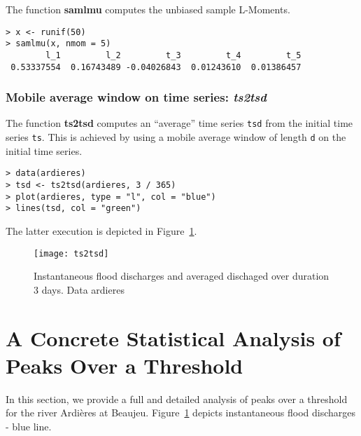 \documentclass[11pt,a4paper]{article}
\numberwithin{equation}{section}
\theoremstyle{definition}
\begin{document}
The function \textbf{samlmu} computes the unbiased sample L-Moments.
\begin{verbatim}
> x <- runif(50)
> samlmu(x, nmom = 5)
        l_1         l_2         t_3         t_4         t_5 
 0.53337554  0.16743489 -0.04026843  0.01243610  0.01386457
\end{verbatim}

\subsubsection{Mobile average window on time series: \emph{ts2tsd}}

The function \textbf{ts2tsd} computes an ``average'' time series
\verb|tsd| from the initial time series \verb|ts|. This is achieved by
using a mobile average window of length \verb|d| on the initial time
series.
\begin{verbatim}
> data(ardieres)
> tsd <- ts2tsd(ardieres, 3 / 365)
> plot(ardieres, type = "l", col = "blue")
> lines(tsd, col = "green")
\end{verbatim}
The latter execution is depicted in Figure~\ref{fig:ts2tsd}.
\begin{figure}
  \centering
  \texttt{[image: ts2tsd]}
  \caption{Instantaneous flood discharges and averaged dischaged over
    duration 3 days. Data ardieres}
  \label{fig:ts2tsd}
\end{figure}

\section{A Concrete Statistical Analysis of Peaks Over a Threshold}
\label{sec:concAn}

In this section, we provide a full and detailed analysis of peaks over
a threshold for the river Ardi\`eres at
Beaujeu. Figure~\ref{fig:ts2tsd} depicts instantaneous flood
discharges - blue line.
\end{document}
